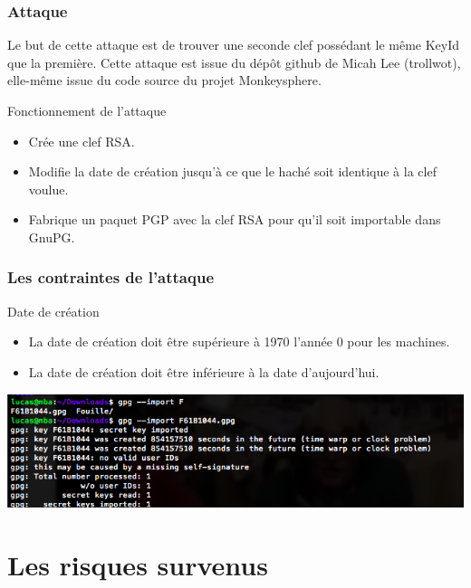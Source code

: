 \begin{frame}
  \frametitle{\color{white}Attaque}
  \begin{block}{ }
  Le but de cette attaque est de trouver une seconde clef possédant le même KeyId que la première. 
  Cette attaque est issue du dépôt github de Micah Lee (trollwot), elle-même issue du code source du projet Monkeysphere.
  \end{block}
  \begin{block}{Fonctionnement de l'attaque}
      \begin{itemize}
        \item Crée une clef RSA.
        \item Modifie la date de création jusqu'à ce que le haché soit identique à la clef voulue.
        \item Fabrique un paquet PGP avec la clef RSA pour qu'il soit importable dans GnuPG.
      \end{itemize}
  \end{block}
\end{frame}

\begin{frame}
  \frametitle{\color{white}Les contraintes de l'attaque}
  \begin{block}{Date de création}
      \begin{itemize}
        \item La date de création doit être supérieure à 1970 l'année 0 pour les machines.
        \item La date de création doit être inférieure à la date d'aujourd'hui.
      \end{itemize}
    \end{block}
    \medbreak
    \includegraphics[scale=0.42]{attaque.png}
\end{frame}


\section{Les risques survenus}
